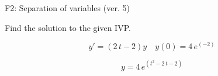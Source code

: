 \begin{exercise}
  \begin{exerciseTitle}F2: Separation of variables (ver. 5)\end{exerciseTitle}
  \begin{exerciseStatement}
    
Find the solution to the given IVP.

    
\[y'=( 2 \, t - 2 )y\hspace{1em} y(0)= 4 \, e^{\left(-2\right)}\]

  \end{exerciseStatement}
  \begin{exerciseAnswer}
    
\[y= 4 \, e^{\left(t^{2} - 2 \, t - 2\right)}\]

  \end{exerciseAnswer}
\end{exercise}